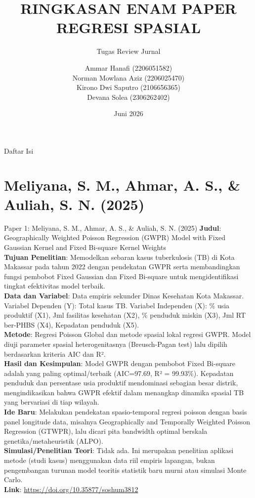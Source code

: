 \documentclass{beamer}
\title[Ringkasan Paper Regresi Spasial]{RINGKASAN ENAM PAPER REGRESI SPASIAL}
\subtitle{Tugas Review Jurnal}
\author[Ammar, Norman, Kirono, Devana]{
    Ammar Hanafi (2206051582) \texorpdfstring{\\}{, }
    Norman Mowlana Aziz (2206025470) \texorpdfstring{\\}{, }
    Kirono Dwi Saputro (2106656365) \texorpdfstring{\\}{, }
    Devana Solea (2306262402)
}
\institute[Univ. Indonesia]{
    Program Studi Sarjana Statistika \\
    Fakultas Matematika dan Ilmu Pengetahuan Alam \\
    Universitas Indonesia
}
\date{Juni 2026}
\begin{document}
\frame{\titlepage}

\begin{frame}{Daftar Isi}
    \tableofcontents
\end{frame}

\section{Meliyana, S. M., Ahmar, A. S., \& Auliah, S. N. (2025)}

\begin{frame}[allowframebreaks]{Paper 1: Meliyana, S. M., Ahmar, A. S., \& Auliah, S. N. (2025)}
    \textbf{Judul}: Geographically Weighted Poisson Regression (GWPR) Model with Fixed Gaussian Kernel and Fixed Bi-square Kernel Weights \\
    \textbf{Tujuan Penelitian}: Memodelkan sebaran kasus tuberkulosis (TB) di Kota Makassar pada tahun 2022 dengan pendekatan GWPR serta membandingkan fungsi pembobot Fixed Gaussian dan Fixed Bi-square untuk mengidentifikasi tingkat efektivitas model terbaik. \\
    \vspace{0.3cm}
    \textbf{Data dan Variabel}: Data empiris sekunder Dinas Kesehatan Kota Makassar. Variabel Dependen (Y): Total kasus TB. Variabel Independen (X): \% usia produktif (X1), Jml fasilitas kesehatan (X2), \% penduduk miskin (X3), Jml RT ber-PHBS (X4), Kepadatan penduduk (X5). \\
    \vspace{0.3cm}
    \textbf{Metode}: Regresi Poisson Global dan metode spasial lokal regresi GWPR. Model diuji parameter spasial heterogenitasnya (Breusch-Pagan test) lalu dipilih berdasarkan kriteria AIC dan R². \\
    \framebreak
    \textbf{Hasil dan Kesimpulan}: Model GWPR dengan pembobot Fixed Bi-square adalah yang paling optimal/terbaik (AIC=97.69, R² = 99.93\%). Kepadatan penduduk dan persentase usia produktif mendominasi sebagian besar distrik, mengindikasikan bahwa GWPR efektif dalam menangkap dinamika spasial TB yang bervariasi di tiap wilayah. \\
    \vspace{0.3cm}
    \textbf{Ide Baru}: Melakukan pendekatan spasio-temporal regresi poisson dengan basis panel longitude data, misalnya Geographically and Temporally Weighted Poisson Regression (GTWPR), lalu dicari pita bandwidth optimal berskala genetika/metaheuristik (ALPO). \\
    \vspace{0.3cm}
    \textbf{Simulasi/Penelitian Teori}: Tidak ada. Ini merupakan penelitian aplikasi metode (studi kasus) menggunakan data riil empiris lapangan, bukan pengembangan turunan model teoritis statistik baru murni atau simulasi Monte Carlo. \\
    \vspace{0.3cm}
    \textbf{Link}: \url{https://doi.org/10.35877/soshum3812}
\end{frame}
\end{document}
